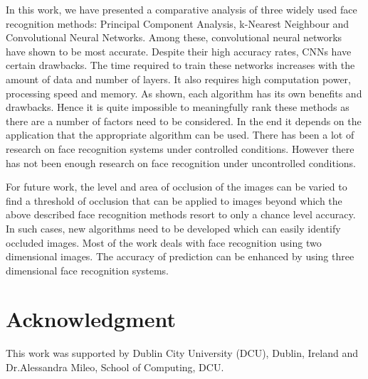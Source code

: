 \documentclass[conference]{IEEEtran}
\begin{document}
In this work, we have presented a comparative analysis of three widely used face recognition methods: Principal Component Analysis, k-Nearest Neighbour and Convolutional Neural Networks. Among these, convolutional neural networks have shown to be most accurate. Despite their high accuracy rates, CNNs have certain drawbacks. The time required to train these networks increases with the amount of data and number of layers. It also requires high computation power, processing speed and memory. As shown, each algorithm has its own benefits and drawbacks. Hence it is quite impossible to meaningfully rank these methods as there are a number of factors need to be considered. In the end it depends on the application that the appropriate algorithm can be used. There has been a lot of research on face recognition systems under controlled conditions. However there has not been enough research on face recognition under uncontrolled conditions.

For future work, the level and area of occlusion of the images can be varied to find a threshold of occlusion that can be applied to images beyond which the above described face recognition methods resort to only a chance level accuracy. In such cases, new algorithms need to be developed which can easily identify occluded images. Most of the work deals with face recognition using two dimensional images. The accuracy of prediction can be enhanced by using three dimensional face recognition systems. \cite{mileo2008wireless} 


\section*{Acknowledgment}
This work was supported by Dublin City University (DCU), Dublin, Ireland and Dr.Alessandra Mileo, School of Computing, DCU.




\end{document}
